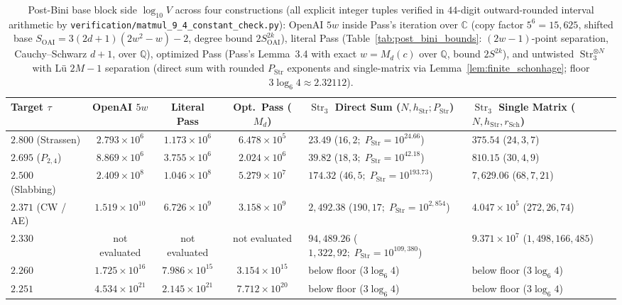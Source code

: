 \documentclass[11pt,a4paper]{article}
\theoremstyle{plain}
\theoremstyle{definition}
\theoremstyle{remark}
\newcommand{\Q}{\mathbb{Q}}
\newcommand{\C}{\mathbb{C}}
\DeclareMathOperator{\Str}{Str}
\begin{document}
\begin{landscape}
\begin{table}[!htbp]
\centering
\footnotesize
\caption{Post-Bini base block side $\log_{10} V$ across four constructions (all explicit integer tuples verified in $44$-digit outward-rounded interval arithmetic by \texttt{verification/matmul\_9\_4\_constant\_check.py}): OpenAI $5w$ inside Pass's iteration over $\C$ (copy factor $5^6 = 15{,}625$, shifted base $S_{\mathrm{OAI}} = 3(2d + 1)(2w^2 - w) - 2$, degree bound $2 S_{\mathrm{OAI}}^{2k}$), literal Pass (Table~\ref{tab:post_bini_bounds}: $(2w - 1)$-point separation, Cauchy--Schwarz $d + 1$, over $\Q$), optimized Pass (Pass's Lemma~3.4 with exact $w = M_d(c)$ over $\Q$, bound $2 S^{2k}$), and untwisted $\Str_3^{\otimes N}$ with L\"u $2M - 1$ separation (direct sum with rounded $P_{\mathrm{Str}}$ exponents and single-matrix via Lemma~\ref{lem:finite_schonhage}; floor $3\log_6 4 \approx 2.32112$).}
\label{tab:degalactic}
\begin{tabular}{@{} l c c c l l @{}}
\toprule
\textbf{Target $\tau$} & \textbf{OpenAI $5w$} & \textbf{Literal Pass} & \textbf{Opt.\ Pass ($M_d$)} & \textbf{$\Str_3$ Direct Sum ($N, h_{\mathrm{Str}}; P_{\mathrm{Str}}$)} & \textbf{$\Str_3$ Single Matrix ($N, h_{\mathrm{Str}}, r_{\mathrm{Sch}}$)} \\
\midrule
$2.800$ (Strassen) & $2.793 \times 10^{6}$ & $1.173 \times 10^{6}$ & $6.478 \times 10^{5}$ & $23.49$ ($16, 2;\; P_{\mathrm{Str}} = 10^{24.66}$) & $375.54$ ($24, 3, 7$) \\
$2.695$ ($P_{2,4}$) & $8.869 \times 10^{6}$ & $3.755 \times 10^{6}$ & $2.024 \times 10^{6}$ & $39.82$ ($18, 3;\; P_{\mathrm{Str}} = 10^{42.18}$) & $810.15$ ($30, 4, 9$) \\
$2.500$ (Slabbing) & $2.409 \times 10^{8}$ & $1.046 \times 10^{8}$ & $5.279 \times 10^{7}$ & $174.32$ ($46, 5;\; P_{\mathrm{Str}} = 10^{193.73}$) & $7{,}629.06$ ($68, 7, 21$) \\
$2.371$ (CW / AE) & $1.519 \times 10^{10}$ & $6.726 \times 10^{9}$ & $3.158 \times 10^{9}$ & $2{,}492.38$ ($190, 17;\; P_{\mathrm{Str}} = 10^{2{,}854}$) & $4.047 \times 10^{5}$ ($272, 26, 74$) \\
$2.330$ & not evaluated & not evaluated & not evaluated & $94{,}489.26$ ($1{,}322, 92;\; P_{\mathrm{Str}} = 10^{109{,}380}$) & $9.371 \times 10^{7}$ ($1{,}498, 166, 485$) \\
$2.260$ & $1.725 \times 10^{16}$ & $7.986 \times 10^{15}$ & $3.154 \times 10^{15}$ & below floor ($3\log_6 4$) & below floor ($3\log_6 4$) \\
$2.251$ & $4.534 \times 10^{21}$ & $2.145 \times 10^{21}$ & $7.712 \times 10^{20}$ & below floor ($3\log_6 4$) & below floor ($3\log_6 4$) \\

\end{tabular}
\end{table}
\end{landscape}
\end{document}
